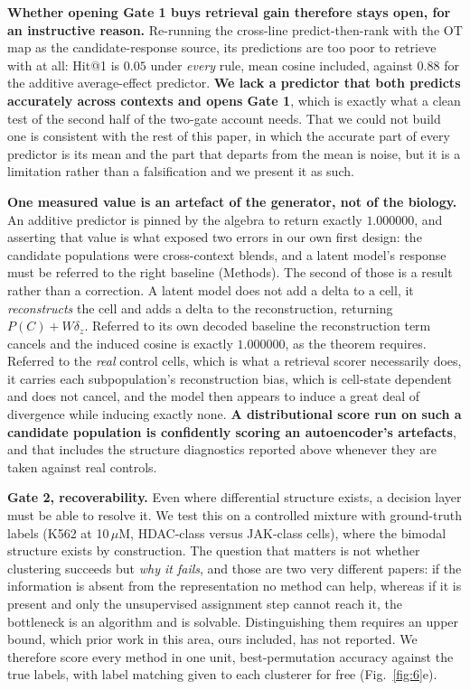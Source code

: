 \documentclass[11pt,letterpaper]{article}
\begin{document}
\textbf{Whether opening Gate 1 buys retrieval gain therefore stays open, for an instructive reason.}
Re-running the cross-line predict-then-rank with the OT map as the candidate-response source, its
predictions are too poor to retrieve with at all: Hit@1 is $0.05$ under \emph{every} rule, mean
cosine included, against $0.88$ for the additive average-effect predictor. \textbf{We lack a
predictor that both predicts accurately across contexts and opens Gate 1}, which is exactly what a
clean test of the second half of the two-gate account needs. That we could not build one is
consistent with the rest of this paper, in which the accurate part of every predictor is its mean
and the part that departs from the mean is noise, but it is a limitation rather than a falsification
and we present it as such.

\textbf{One measured value is an artefact of the generator, not of the biology.} An additive
predictor is pinned by the algebra to return exactly $1.000000$, and asserting that value is what
exposed two errors in our own first design: the candidate populations were cross-context blends,
and a latent model's response must be referred to the right baseline (Methods). The second of those
is a result rather than a correction. A latent model does not add a delta to a cell, it
\emph{reconstructs} the cell and adds a delta to the reconstruction, returning $P(C) + W\delta_z$.
Referred to its own decoded baseline the reconstruction term cancels and the induced cosine is
exactly $1.000000$, as the theorem requires. Referred to the \emph{real} control cells, which is
what a retrieval scorer necessarily does, it carries each subpopulation's reconstruction bias,
which is cell-state dependent and does not cancel, and the model then appears to induce a great
deal of divergence while inducing exactly none. \textbf{A distributional score run on such a
candidate population is confidently scoring an autoencoder's artefacts}, and that includes the
structure diagnostics reported above whenever they are taken against real controls.

\textbf{Gate 2, recoverability.} Even where differential structure exists, a decision layer must be
able to resolve it. We test this on a controlled mixture with ground-truth labels (K562 at
10\,$\mu$M, HDAC-class versus JAK-class cells), where the bimodal structure exists by construction.
The question that matters is not whether clustering succeeds but \emph{why it fails}, and those are
two very different papers: if the information is absent from the representation no method can help,
whereas if it is present and only the unsupervised assignment step cannot reach it, the bottleneck
is an algorithm and is solvable. Distinguishing them requires an upper bound, which prior work in
this area, ours included, has not reported. We therefore score every method in one unit,
best-permutation accuracy against the true labels, with label matching given to each clusterer for
free (Fig.~\ref{fig:6}e).
\end{document}
